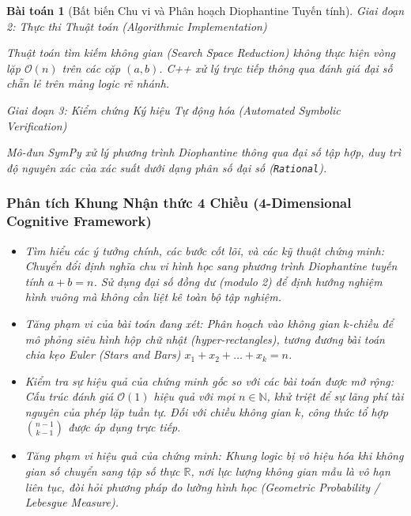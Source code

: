 \documentclass{article}
\newtheorem{baitoan}{Bài toán}
\begin{document}
\begin{baitoan}[Bất biến Chu vi và Phân hoạch Diophantine Tuyến tính]
\vspace{0.5em}\noindent\emph{Giai đoạn 2: Thực thi Thuật toán (Algorithmic Implementation)}
 
 Thuật toán tìm kiếm không gian (Search Space Reduction) không thực hiện vòng lặp $\mathcal{O}(n)$ trên các cặp $(a,b)$. C++ xử lý trực tiếp thông qua đánh giá đại số chẵn lẻ trên mảng logic rẽ nhánh.



\vspace{0.5em}\noindent\emph{Giai đoạn 3: Kiểm chứng Ký hiệu Tự động hóa (Automated Symbolic Verification)}
 
 Mô-đun \textsf{SymPy} xử lý phương trình Diophantine thông qua đại số tập hợp, duy trì độ nguyên xác của xác suất dưới dạng phân số đại số (\texttt{Rational}).



  \subsubsection*{Phân tích Khung Nhận thức 4 Chiều (4-Dimensional Cognitive Framework)}
 \begin{itemize}
 \item \textit{Tìm hiểu các ý tưởng chính, các bước cốt lõi, và các kỹ thuật chứng minh}: Chuyển đổi định nghĩa chu vi hình học sang phương trình Diophantine tuyến tính $a+b=n$. Sử dụng đại số đồng dư (modulo 2) để định hướng nghiệm hình vuông mà không cần liệt kê toàn bộ tập nghiệm.
 \item \textit{Tăng phạm vi của bài toán đang xét}: Phân hoạch vào không gian $k$-chiều để mô phỏng siêu hình hộp chữ nhật (hyper-rectangles), tương đương bài toán chia kẹo Euler (Stars and Bars) $x_1 + x_2 + \dots + x_k = n$.
 \item \textit{Kiểm tra sự hiệu quả của chứng minh gốc so với các bài toán được mở rộng}: Cấu trúc đánh giá $\mathcal{O}(1)$ hiệu quả với mọi $n \in \mathbb{N}$, khử triệt để sự lãng phí tài nguyên của phép lặp tuần tự. Đối với chiều không gian $k$, công thức tổ hợp $\binom{n-1}{k-1}$ được áp dụng trực tiếp.
 \item \textit{Tăng phạm vi hiệu quả của chứng minh}: Khung logic bị vô hiệu hóa khi không gian số chuyển sang tập số thực $\mathbb{R}$, nơi lực lượng không gian mẫu là vô hạn liên tục, đòi hỏi phương pháp đo lường hình học (Geometric Probability / Lebesgue Measure).
 \end{itemize}
\end{baitoan}
\end{document}
